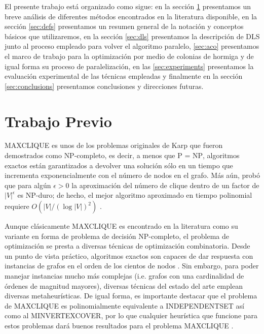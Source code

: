 \documentclass[conference]{IEEEtran}
\begin{document}
El presente trabajo está organizado como sigue: en la sección
\ref{sec:prev-work} presentamos un breve análisis de diferentes
métodos encontrados en la literatura disponible, en la sección
\ref{sec:defs} presentamos un resumen general de la notación y
conceptos básicos que utilizaremos, en la sección \ref{sec:dls}
presentamos la descripción de DLS junto al proceso empleado para
volver el algoritmo paralelo, \ref{sec:aco} presentamos el marco de
trabajo para la optimización por medio de colonias de hormiga y de
igual forma su proceso de paralelización, en las \ref{sec:experiments}
presentamos la evaluación experimental de las técnicas empleadas y
finalmente en la sección \ref{sec:conclusions} presentamos
conclusiones y direcciones futuras.

\section{Trabajo Previo}
\label{sec:prev-work}

\textsf{MAXCLIQUE} es unos de los problemas originales de Karp
\cite{karp} que fueron demostrados como \textsc{NP}-completo, es
decir, a menos que \textsc{P} = \textsc{NP}, algoritmos exactos están
garantizados a devolver una solución sólo en un tiempo que incrementa
exponencialmente con el número de nodos en el grafo. Más aún,
\cite{arora1} probó que para algún $\epsilon > 0$ la aproximación del
número de clique dentro de un factor de $|V|^\epsilon$ es
\textsc{NP}-duro; de hecho, el mejor algoritmo aproximado en tiempo
polinomial requiere $O(|V|/(\log{|V|})^2)$ \cite{best-approx}.

Aunque clásicamente \textsf{MAXCLIQUE} es encontrado en la literatura
como su variante en forma de problema de decisión
\textsc{NP}-completo, el problema de optimización se presta a diversas
técnicas de optimización combinatoria. Desde un punto de vista
práctico, algoritmos exactos son capaces de dar respuesta con
instancias de grafos en el orden de los cientos de nodos
\cite{oster,shinano, wood}. Sin embargo, para poder manejar instancias
mucho más complejas (i.e. grafos con una cardinalidad de órdenes de
magnitud mayores), diversas técnicas del estado del arte emplean
diversas metaheurísticas.  De igual forma, es importante destacar que
el problema de \textsf{MAXCLIQUE} es polinomialmente equivalente a
\textsf{INDEPENDENTSET} así como al \textsf{MINVERTEXCOVER}, por lo
que cualquier heurística que funcione para estos problemas dará buenos
resultados para el problema \textsf{MAXCLIQUE} \cite{Bomze99}.
\end{document}
